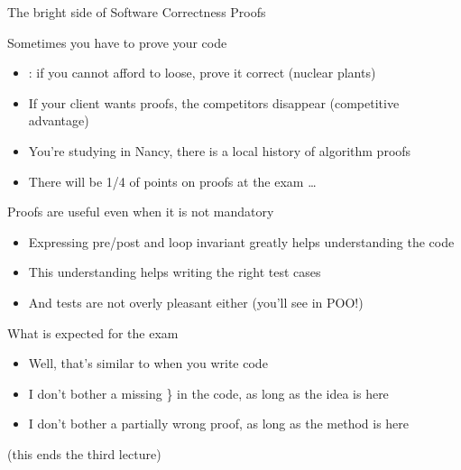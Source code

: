 \begin{frame}{The bright side of Software Correctness Proofs}
  \begin{block}{Sometimes you \alert{have to} prove your code}
    \begin{itemize}
    \item {}: if you cannot afford to loose, prove it correct
      {\small (nuclear plants)}
    \item If your client wants proofs, the competitors disappear
      {\small(competitive advantage)}
    \item You're studying in Nancy, there is a local history of algorithm proofs
    \item There will be 1/4 of points on proofs at the exam \ldots
    \end{itemize}
  \end{block}\vspace{-.2\baselineskip}

  \begin{block}{Proofs are useful even when it is not mandatory}
    \begin{itemize}
    \item Expressing pre/post and loop invariant greatly helps understanding the code
    \item This understanding helps writing the right test cases
    \item And tests are not overly pleasant either (you'll see in POO!)
    \end{itemize}
  \end{block}\vspace{-.2\baselineskip}

  \begin{block}{What is expected for the exam}
    \begin{itemize}
    \item Well, that's similar to when you write code
    \item I don't bother a missing \} in the code, as long as the idea is here
    \item I don't bother a partially wrong proof, as long as the method is here
    \end{itemize}
  \end{block}\vspace{-.5\baselineskip}

  \begin{flushright}
    (this ends the third lecture)    
  \end{flushright}

\end{frame}

